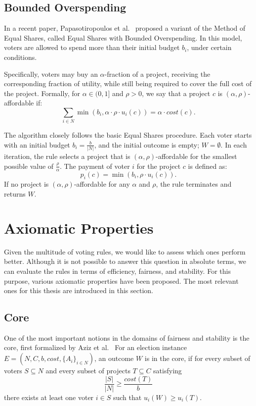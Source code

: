 \documentclass[magisterska,en]{pracamgr}
\begin{document}
\subsection{Bounded Overspending}

In a recent paper, Papasotiropoulos et al.~\cite{11} proposed a variant of the Method of Equal Shares, called Equal Shares with Bounded Overspending. In this model, voters are allowed to spend more than their initial budget $b_i$, under certain conditions.

Specifically, voters may buy an $\alpha$-fraction of a project, receiving the corresponding fraction of utility, while still being required to cover the full cost of the project. Formally, for $\alpha\in(0,1]$ and $\rho>0$, we say that a project $c$ is {$(\alpha,\rho)$-affordable} if:
$$
\sum_{i\in N}\min(b_i, \alpha\cdot\rho\cdot u_i(c)) = \alpha\cdot cost(c).
$$

The algorithm closely follows the basic Equal Shares procedure. Each voter starts with an initial budget $b_i=\frac{b}{|N|}$, and the initial outcome is empty; $W = \emptyset$. In each iteration, the rule selects a project that is $(\alpha,\rho)$-affordable for the smallest possible value of $\frac{\rho}{\alpha}$. The payment of voter $i$ for the project $c$ is defined as:
$$
p_i(c) = \min(b_i, \rho\cdot u_i(c)).
$$
If no project is $(\alpha,\rho)$-affordable for any $\alpha$ and $\rho$, the rule terminates and returns $W$.

\section{Axiomatic Properties}

Given the multitude of voting rules, we would like to assess which ones perform better. Although it is not possible to answer this question in absolute terms, we can evaluate the rules in terms of efficiency, fairness, and stability. For this purpose, various axiomatic properties have been proposed. The most relevant ones for this thesis are introduced in this section.

\subsection{Core}

One of the most important notions in the domains of fairness and stability is the core, first formalized by Aziz et al.~\cite{12} For an election instance $E=(N, C, b, cost, \{A_i\}_{i\in N})$, an outcome $W$ is in the core, if for every subset of voters $S\subseteq N$ and every subset of projects $T\subseteq C$ satisfying
$$
\frac{|S|}{|N|} \geq \frac{cost(T)}{b}
$$
there exists at least one voter $i\in S$ such that $u_i(W)\geq u_i(T)$.
\end{document}
